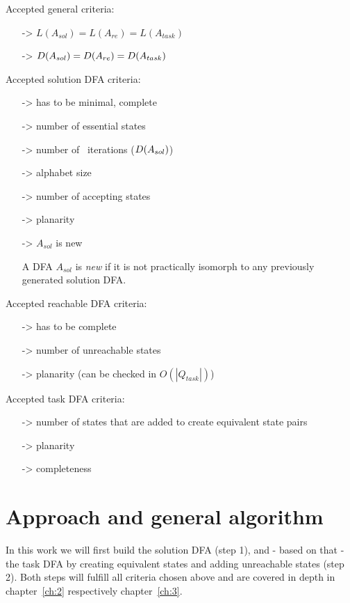 \label{ch:1:determined-requirements}
Accepted general criteria:
\begin{itemize}
	\item[->] $L(A_{sol}) = L(A_{re}) = L(A_{task})$
	\item[->] $D(A_{sol}) = D(A_{re}) = D(A_{task})$
\end{itemize}
Accepted solution DFA criteria:
\begin{itemize}
	\item[->] has to be minimal, complete
	\item[->] number of essential states
	\item[->] number of \CompDist\ iterations ($D(A_{sol})$)
	\item[->] alphabet size
	\item[->] number of accepting states
	\item[->] planarity
	\item[->] $A_{sol}$ is new
	
	\begin{definition} \label{ch:1:new-dfa}
		A DFA $A_{sol}$ is \emph{new} if it is not practically isomorph to any previously generated solution DFA.
	\end{definition}
\end{itemize}
Accepted reachable DFA criteria:
\begin{itemize}
	\item[->] has to be complete
	\item[->] number of unreachable states
	\item[->] planarity (can be checked in $O(|Q_{task}|)$)
\end{itemize}
Accepted task DFA criteria:
\begin{itemize}
	\item[->] number of states that are added to create equivalent state pairs
	\item[->] planarity
	\item[->] completeness
\end{itemize}

\section{Approach and general algorithm}

In this work we will first build the solution DFA (step 1), and - based on that - the task DFA by creating equivalent states and adding unreachable states (step 2). Both steps will fulfill all criteria chosen above and are covered in depth in chapter~\ref{ch:2} respectively chapter~\ref{ch:3}.

